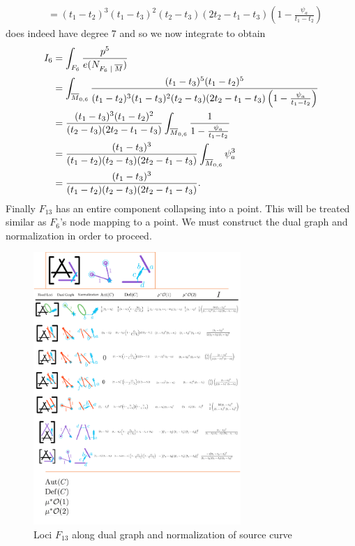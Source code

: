 \documentclass[12pt]{memoir}
\begin{document}
\begin{Ex}
\begin{align*}
        &=(t_1-t_2)^3(t_1-t_3)^2(t_2-t_3)(2t_2-t_1-t_3)\left(1-\frac{\psi_a}{t_1-t_2}\right)
    \end{align*}
    does indeed have degree $7$ and so we now integrate to obtain
    \begin{align*}
        I_6&=\int_{F_6}\frac{p^5}{e(N_{F_6\mid\ov M})}\\
        &=\int_{\ov M_{0,6}}\frac{(t_1-t_3)^5(t_1-t_2)^5}{(t_1-t_2)^3(t_1-t_3)^2(t_2-t_3)(2t_2-t_1-t_3)\left(1-\frac{\psi_a}{t_1-t_2}\right)}\\
        &=\frac{(t_1-t_3)^3(t_1-t_2)^2}{(t_2-t_3)(2t_2-t_1-t_3)}\int_{\ov M_{0,6}}\frac{1}{1-\frac{\psi_a}{t_1-t_2}}\\
        &=\frac{(t_1-t_3)^3}{(t_1-t_2)(t_2-t_3)(2t_2-t_1-t_3)}\int_{\ov M_{0,6}}\psi_a^3\\
        &=\frac{(t_1-t_3)^3}{(t_1-t_2)(t_2-t_3)(2t_2-t_1-t_3)}.
    \end{align*}
    Finally $F_{13}$ has an entire component collapsing into a point. This will be treated similar as $F_6$'s node mapping to a point. We must construct the dual graph and normalization in order to proceed.\begin{figure}[h!]
        \centering
        \includegraphics[width=0.7\textwidth, trim= 1.32cm 24.6cm 9cm 0.1cm,clip]{../figs/FigsDNnotability4.pdf}
        \caption{Loci $F_{13}$ along dual graph and normalization of source curve}
        \label{fig:quadratic-F13-5-marks}

\end{figure}
\end{Ex}
\end{document}
